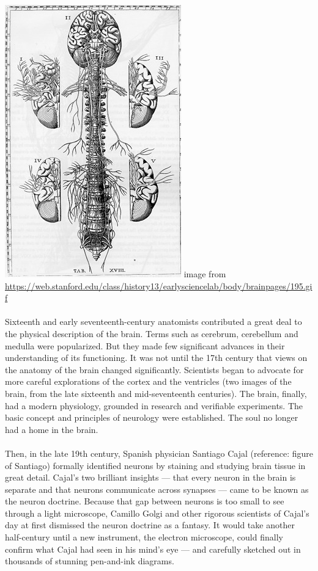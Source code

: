 \documentclass[12pt,a4paper]{article}
\begin{document}
\includegraphics[scale=1]{brain195.jpg}\newline
image from \url{https://web.stanford.edu/class/history13/earlysciencelab/body/brainpages/195.gif}
\paragraph{}
Sixteenth and early seventeenth-century anatomists contributed a great deal to the physical description of the brain. Terms such as cerebrum, cerebellum and medulla were popularized. But they made few significant advances in their understanding of its functioning.  It was not until the 17th century that views on the anatomy of the brain changed significantly. Scientists began to advocate for more careful explorations of the cortex and the ventricles (two images of the brain, from the late sixteenth and mid-seventeenth centuries). The brain, finally, had a modern physiology, grounded in research and verifiable experiments. The basic concept and principles of neurology were established. The soul no longer had a home in the brain.
\paragraph{}
Then, in the late 19th century, Spanish physician Santiago Cajal (reference: figure of Santiago) formally identified neurons by staining and studying brain tissue in great detail. Cajal’s two brilliant insights — that every neuron in the brain is separate and that neurons communicate across synapses — came to be known as the neuron doctrine. Because that gap between neurons is too small to see through a light microscope, Camillo Golgi and other rigorous scientists of Cajal’s day at first dismissed the neuron doctrine as a fantasy. It would take another half-century until a new instrument, the electron microscope, could finally confirm what Cajal had seen in his mind’s eye — and carefully sketched out in thousands of stunning pen-and-ink diagrams.
\end{document}
